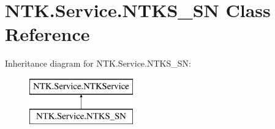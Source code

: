 \hypertarget{class_n_t_k_1_1_service_1_1_n_t_k_s___s_n}{}\section{N\+T\+K.\+Service.\+N\+T\+K\+S\+\_\+\+SN Class Reference}
\label{class_n_t_k_1_1_service_1_1_n_t_k_s___s_n}


 


Inheritance diagram for N\+T\+K.\+Service.\+N\+T\+K\+S\+\_\+\+SN\+:\begin{figure}[H]
\begin{center}
\leavevmode
\includegraphics[height=2.000000cm]{d3/dd7/class_n_t_k_1_1_service_1_1_n_t_k_s___s_n}
\end{center}
\end{figure}
